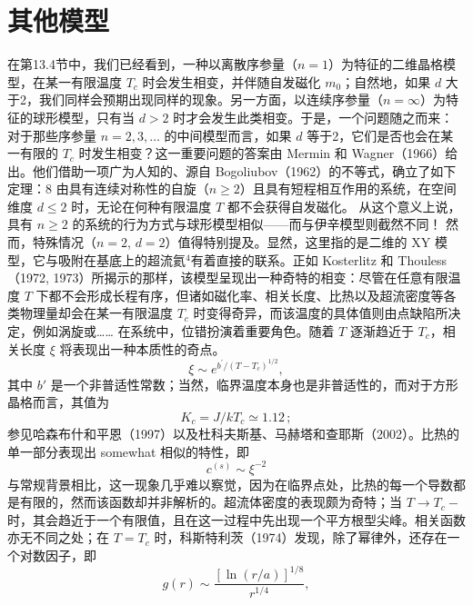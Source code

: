 \section{其他模型}\label{ux5176ux4ed6ux6a21ux578b}
在第13.4节中，我们已经看到，一种以离散序参量（\(n=1\)）为特征的二维晶格模型，在某一有限温度 \(T_c\) 时会发生相变，并伴随自发磁化 \(m_0\)；自然地，如果 \(d\) 大于2，我们同样会预期出现同样的现象。另一方面，以连续序参量（\(n=\infty\)）为特征的球形模型，只有当 \(d>2\) 时才会发生此类相变。于是，一个问题随之而来：对于那些序参量 \(n=2,3,\ldots\) 的中间模型而言，如果 \(d\) 等于2，它们是否也会在某一有限的 \(T_c\) 时发生相变？这一重要问题的答案由 Mermin 和 Wagner（1966）给出。他们借助一项广为人知的、源自 Bogoliubov（1962）的不等式，确立了如下定理：8
由具有连续对称性的自旋（\(n \geq 2\)）且具有短程相互作用的系统，在空间维度 \(d \leq 2\) 时，无论在何种有限温度 \(T\) 都不会获得自发磁化。
从这个意义上说，具有 \(n \geq 2\) 的系统的行为方式与球形模型相似——而与伊辛模型则截然不同！
然而，特殊情况（\(n=2\), \(d=2\)）值得特别提及。显然，这里指的是二维的 XY 模型，它与吸附在基底上的超流氦\(^{4}\)有着直接的联系。正如 Kosterlitz 和 Thouless（1972, 1973）所揭示的那样，该模型呈现出一种奇特的相变：尽管在任意有限温度 \(T\) 下都不会形成长程有序，但诸如磁化率、相关长度、比热以及超流密度等各类物理量却会在某一有限温度 \(T_{c}\) 时变得奇异，而该温度的具体值则由点缺陷所决定，例如涡旋或\ldots\ldots{}
在系统中，位错扮演着重要角色。随着 \(T\) 逐渐趋近于 \(T_{c}\)，相关长度 \(\xi\) 将表现出一种本质性的奇点。
\begin{equation}\tag{13.7.1}\label{eq:13.7.1}
\xi \sim e ^{b ^ { \prime} / ( T - T _ { c } ) ^{1 / 2} } ,
\end{equation}
其中 \(b'\) 是一个非普适性常数；当然，临界温度本身也是非普适性的，而对于方形晶格而言，其值为
\begin{equation}\tag{13.7.2}\label{eq:13.7.2}
K _ { c } = J / k T _ { c } \simeq 1 . 12 \, ;
\end{equation}
参见哈森布什和平恩（1997）以及杜科夫斯基、马赫塔和查耶斯（2002）。比热的单一部分表现出 somewhat 相似的特性，即
\begin{equation}\tag{13.7.3}\label{eq:13.7.3}
c ^{( s )} \sim \xi ^{- 2}
\end{equation}
与常规背景相比，这一现象几乎难以察觉，因为在临界点处，比热的每一个导数都是有限的，然而该函数却并非解析的。超流体密度的表现颇为奇特；当 \(T \rightarrow T_{c}-\) 时，其会趋近于一个有限值，且在这一过程中先出现一个平方根型尖峰。相关函数亦无不同之处；在 \(T = T_{c}\) 时，科斯特利茨（1974）发现，除了幂律外，还存在一个对数因子，即
\begin{equation}\tag{13.7.4}\label{eq:13.7.4}
g ( r ) \sim \frac { [ \ln ( r / a ) ] ^{1 / 8} } { r ^{1 / 4} } ,
\end{equation}
